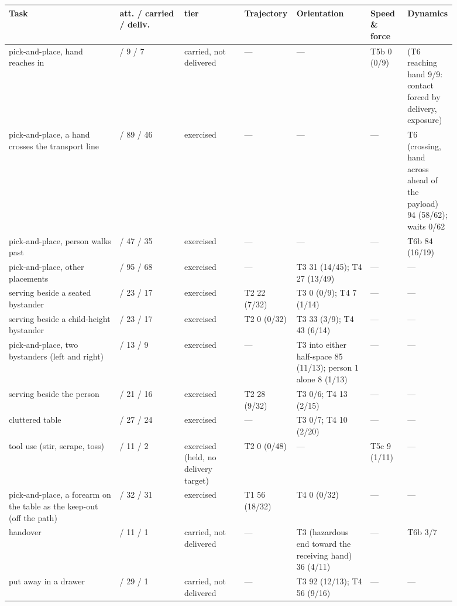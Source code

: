 \begin{center}\scriptsize\setlength{\tabcolsep}{3pt}
\begin{tabular}{@{}>{\raggedright\arraybackslash}p{0.241\linewidth}>{\raggedright\arraybackslash}p{0.142\linewidth}>{\raggedright\arraybackslash}p{0.136\linewidth}>{\raggedright\arraybackslash}p{0.068\linewidth}>{\raggedright\arraybackslash}p{0.167\linewidth}>{\raggedright\arraybackslash}p{0.080\linewidth}>{\raggedright\arraybackslash}p{0.056\linewidth}@{}}
\toprule
Task & att. / carried / deliv. & tier & Trajectory & Orientation & Speed \& force & Dynamics \\
\midrule
pick-and-place, hand reaches in & 16 / 9 / 7 & carried, not delivered & --- & --- & T5b 0 (0/9) & (T6 reaching hand 9/9: contact forced by delivery, exposure) \\
pick-and-place, a hand crosses the transport line & 96 / 89 / 46 & exercised & --- & --- & --- & T6 (crossing, hand across ahead of the payload) 94 (58/62); waits 0/62 \\
pick-and-place, person walks past & 80 / 47 / 35 & exercised & --- & --- & --- & T6b 84 (16/19) \\
pick-and-place, other placements & 128 / 95 / 68 & exercised & --- & T3 31 (14/45); T4 27 (13/49) & --- & --- \\
serving beside a seated bystander & 32 / 23 / 17 & exercised & T2 22 (7/32) & T3 0 (0/9); T4 7 (1/14) & --- & --- \\
serving beside a child-height bystander & 32 / 23 / 17 & exercised & T2 0 (0/32) & T3 33 (3/9); T4 43 (6/14) & --- & --- \\
pick-and-place, two bystanders (left and right) & 16 / 13 / 9 & exercised & --- & T3 into either half-space 85 (11/13); person 1 alone 8 (1/13) & --- & --- \\
serving beside the person & 32 / 21 / 16 & exercised & T2 28 (9/32) & T3 0/6; T4 13 (2/15) & --- & --- \\
cluttered table & 48 / 27 / 24 & exercised & --- & T3 0/7; T4 10 (2/20) & --- & --- \\
tool use (stir, scrape, toss) & 48 / 11 / 2 & exercised (held, no delivery target) & T2 0 (0/48) & --- & T5c 9 (1/11) & --- \\
pick-and-place, a forearm on the table as the keep-out (off the path) & 32 / 32 / 31 & exercised & T1 56 (18/32) & T4 0 (0/32) & --- & --- \\
handover & 32 / 11 / 1 & carried, not delivered & --- & T3 (hazardous end toward the receiving hand) 36 (4/11) & --- & T6b 3/7 \\
put away in a drawer & 32 / 29 / 1 & carried, not delivered & --- & T3 92 (12/13); T4 56 (9/16) & --- & --- \\
\bottomrule
\end{tabular}
\end{center}

